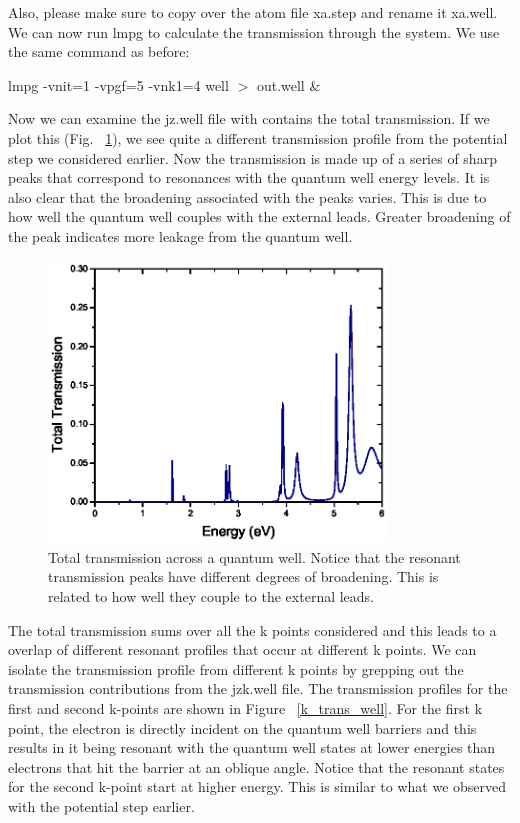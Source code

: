 \documentclass[10pt]{article}
\begin{document}
Also, please make sure to copy over the atom file xa.step and rename it xa.well.  We can now run lmpg to calculate the transmission through the system.  We use the same command as before:

\begin{center}
lmpg -vnit=1 -vpgf=5 -vnk1=4 well $>$ out.well \&
\end{center}

Now we can examine the jz.well file with contains the total transmission.  If we plot this (Fig. ~\ref{total_trans_well}), we see quite a different transmission profile from the potential step we considered earlier.  Now the transmission is made up of a series of sharp peaks that correspond to resonances with the quantum well energy levels.  It is also clear that the broadening associated with the peaks varies.  This is due to how well the quantum well couples with the external leads.  Greater broadening of the peak indicates more leakage from the quantum well.  

\begin{figure}
\begin{center}
\centering
\includegraphics[angle=0,width=9.00cm]{well_transmission.eps}
\caption{Total transmission across a quantum well.  Notice that the resonant transmission peaks have different degrees of broadening.  This is related to how well they couple to the external leads.}
\label{total_trans_well} 
\end{center}
\end{figure}

The total transmission sums over all the k points considered and this leads to a overlap of different resonant profiles that occur at different k points.  We can isolate the transmission profile from different k points by grepping out the transmission contributions from the jzk.well file.  The transmission profiles for the first and second k-points are shown in Figure ~\ref{k_trans_well}.  For the first k point, the electron is directly incident on the quantum well barriers and this results in it being resonant with the quantum well states at lower energies than electrons that hit the barrier at an oblique angle.  Notice that the resonant states for the second k-point start at higher energy.  This is similar to what we observed with the potential step earlier.
\end{document}
